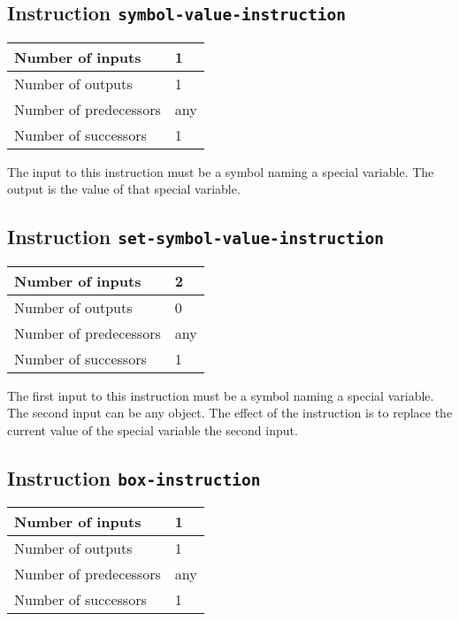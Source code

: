 \subsection{Instruction \texttt{symbol-value-instruction}}
\label{mir-instruction-symbol-value}

\begin{tabular}{|l|l|}
\hline
Number of inputs & 1\\
\hline
Number of outputs & 1\\
\hline
Number of predecessors & any\\
\hline
Number of successors & 1\\
\hline
\end{tabular}

The input to this instruction must be a symbol naming a special
variable.  The output is the value of that special variable.

\subsection{Instruction \texttt{set-symbol-value-instruction}}
\label{mir-instruction-set-symbol-value}

\begin{tabular}{|l|l|}
\hline
Number of inputs & 2\\
\hline
Number of outputs & 0\\
\hline
Number of predecessors & any\\
\hline
Number of successors & 1\\
\hline
\end{tabular}

The first input to this instruction must be a symbol naming a
special variable.  The second input can be any object.  The effect of
the instruction is to replace the current value of the special
variable the second input.

\subsection{Instruction \texttt{box-instruction}}
\label{mir-instruction-box}

\begin{tabular}{|l|l|}
  \hline
  Number of inputs & 1\\
  \hline
  Number of outputs & 1\\
  \hline
  Number of predecessors & any\\
  \hline
  Number of successors & 1\\
  \hline
\end{tabular}

